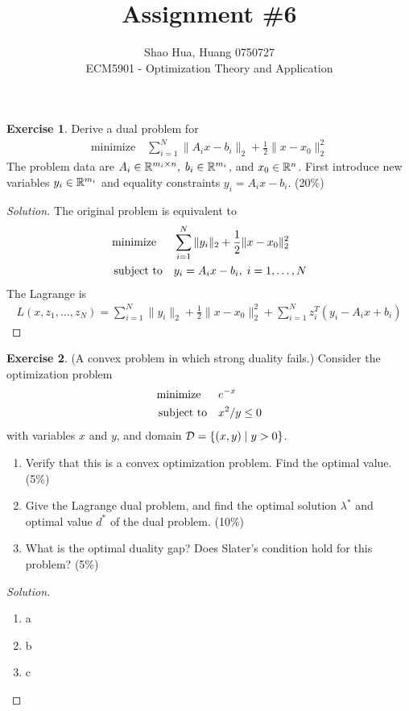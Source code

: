 \documentclass[12pt]{extarticle}
\title{Assignment \#6}
\author{Shao Hua, Huang 0750727\\
ECM5901 - Optimization Theory and Application}
\theoremstyle{definition}
\newtheorem{exercise}{Exercise}
\begin{document}
\maketitle

\begin{exercise}
  Derive a dual problem for
  \begin{align*}
    \text{minimize}\quad \sum_{i=1}^N\|A_ix-b_i\|_2+\frac{1}{2}\|x-x_0\|_2^2
  \end{align*}
  The problem data are $A_i\in \mathbb{R}^{m_i\times n},\;b_i\in\mathbb{R}^{m_i}$, and $x_0\in\mathbb{R}^n$.
  First introduce new variables $y_i\in\mathbb{R}^{m_i}$ and equality constraints $y_i=A_ix-b_i$. (20\%)
\end{exercise}
\begin{proof}[Solution]
  \let\qed\relax
  The original problem is equivalent to
  \begin{align*}
    \text{minimize\;\;}\quad& \sum_{i=1}^N\|y_i\|_2+\frac{1}{2}\|x-x_0\|_2^2\\
    \text{subject to}  \quad& y_i=A_ix-b_i,\;i=1,\dots,N
  \end{align*}
  The Lagrange is
  \begin{align*}
    L(x,z_1,\dots,z_N)=\sum_{i=1}^N\|y_i\|_2+\frac{1}{2}\|x-x_0\|_2^2+\sum_{i=1}^Nz_i^T(y_i-A_ix+b_i)
  \end{align*}
\end{proof}

\begin{exercise}
  (A convex problem in which strong duality fails.)
  Consider the optimization problem
  \begin{align*}
    \text{minimize\;\;}\quad&e^{-x}\\
    \text{subject to}  \quad&x^2/y\le 0
  \end{align*}
  with variables $x$ and $y$, and domain $\mathcal{D}=\{(x,y)\mid y>0\}$.
  \begin{enumerate}[label=(\alph*)]
    \item Verify that this is a convex optimization problem. Find the optimal value. (5\%)
    \item Give the Lagrange dual problem, and find the optimal solution $\lambda^\ast$ and optimal value $d^\ast$ of the dual problem. (10\%)
    \item What is the optimal duality gap? Does Slater's condition hold for this problem? (5\%)
  \end{enumerate}
\end{exercise}
\begin{proof}[Solution]
  \let\qed\relax
  $ $
  \begin{enumerate}[label=(\alph*)]
    \item a
    \item b
    \item c
  \end{enumerate}
\end{proof}
\end{document}

